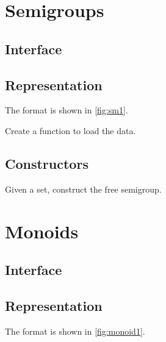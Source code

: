 \section{Semigroups}

\subsection*{Interface}



\subsection*{Representation}

The format is shown in \cref{fig:sm1}.



\begin{exercise}[Representation]
Create a function to load the data.



\end{exercise}

\subsection*{Constructors}

\begin{exercise}
Given a set, construct the free semigroup.

\end{exercise}


\section{Monoids}

\subsection*{Interface}



\subsection*{Representation}

The format is shown in \cref{fig:monoid1}.



